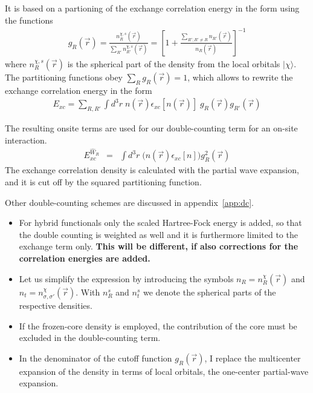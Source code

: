 \documentclass[11pt,a4paper]{report}
\begin{document}
It is based on a partioning of the exchange correlation energy in the form
using the functions 
\begin{eqnarray}
g_R(\vec{r})
=\frac{n^{\chi,s}_R(\vec{r})}{\sum_{R'}n^{\chi,s}_{R'}(\vec{r})}
=\left[1+\frac{\sum_{R';R'\neq R} n_{R'}(\vec{r})}{n_{R}(\vec{r})}\right]^{-1}
\end{eqnarray}
where $n^{\chi,s}_R(\vec{r})$ is the spherical part of the density from
the local orbitals $|\chi\rangle$.  The partitioning functions obey
$\sum_R g_R(\vec{r})=1$, which allows to rewrite the exchange
correlation energy in the form
\begin{eqnarray}
E_{xc}=\sum_{R,R'}\int d^3r\; 
n(\vec{r})\epsilon_{xc}[n(\vec{r})]\;g_R(\vec{r})g_{R'}(\vec{r})
\end{eqnarray}

The resulting onsite terms are used for our double-counting term for
an on-site interaction. 
\begin{eqnarray}
E_{xc}^{\hat{W}_R} &=& \int d^3r\; \biggl(n(\vec{r})
\epsilon_{xc}[n]\biggr) g_R^2(\vec{r})
\end{eqnarray}
The exchange correlation density is calculated with the partial wave
expansion, and it is cut off by the squared partitioning function.

Other double-counting schemes are discussed in appendix~\ref{app:dc}.

\begin{itemize}
\item For hybrid functionals only the scaled Hartree-Fock energy is
  added, so that the double counting is weighted as well and it is
  furthermore limited to the exchange term only. \textbf{This will be
    different, if also corrections for the correlation energies are
    added.}
%
\item Let us simplify the expression by introducing the symbols
  $n_R=n^\chi_R(\vec{r})$ and $n_t=n^\chi_{\sigma,\sigma'}(\vec{r})$.
  With $n^s_R$ and $n^s_t$ we denote the spherical parts of the
  respective densities.
%
\item If the frozen-core density is employed, the contribution of the
  core must be excluded in the double-counting term.
%
\item In the denominator of the cutoff function $g_R(\vec{r})$, I
  replace the multicenter expansion of the density in terms of local
  orbitals, the one-center partial-wave expansion.
\end{itemize}
\end{document}
